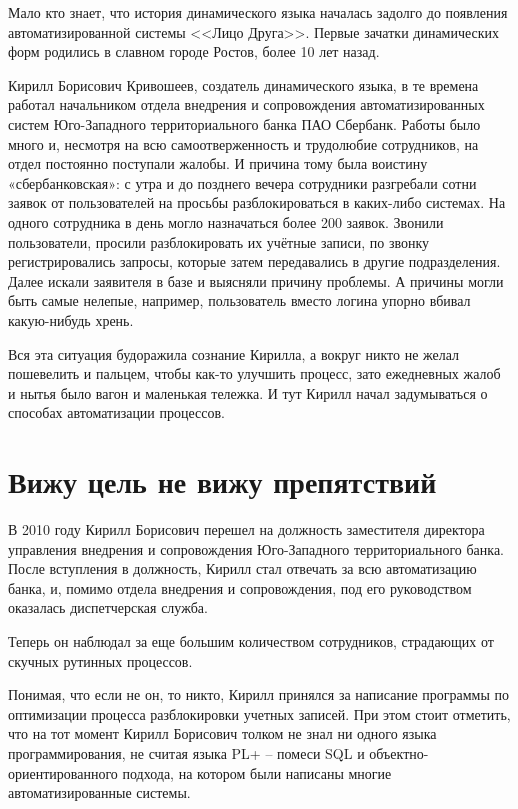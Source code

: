 \documentclass[../index.tex]{subfiles}
\begin{document}
Мало кто знает, что история динамического языка началась задолго до появления автоматизированной системы <<Лицо Друга>>. Первые зачатки динамических форм родились в славном городе Ростов, более 10 лет назад.


Кирилл Борисович Кривошеев, создатель динамического языка,  в те времена работал начальником отдела внедрения и сопровождения автоматизированных систем Юго-Западного территориального банка ПАО Сбербанк. Работы было много и, несмотря на всю самоотверженность и трудолюбие сотрудников, на отдел постоянно поступали жалобы. И причина тому была воистину «сбербанковская»: с утра и до позднего вечера сотрудники разгребали сотни заявок от пользователей на просьбы разблокироваться в каких-либо системах. На одного сотрудника в день могло назначаться более 200 заявок. Звонили пользователи, просили разблокировать их учётные записи, по звонку регистрировались запросы, которые затем передавались в другие подразделения. Далее искали заявителя в базе и выясняли причину проблемы. А причины могли быть самые нелепые, например, пользователь вместо логина упорно вбивал какую-нибудь хрень.


Вся эта ситуация будоражила сознание Кирилла, а вокруг никто не желал пошевелить и пальцем, чтобы как-то улучшить процесс, зато ежедневных жалоб и нытья было вагон и маленькая тележка.
И тут Кирилл начал задумываться о способах автоматизации процессов.

\section{Вижу цель не вижу препятствий}

В 2010 году Кирилл Борисович перешел на должность заместителя директора управления внедрения и сопровождения Юго-Западного территориального банка. После вступления в должность, Кирилл стал отвечать за всю автоматизацию банка, и, помимо отдела внедрения и сопровождения, под его руководством оказалась диспетчерская служба.

Теперь он наблюдал за еще большим количеством сотрудников, страдающих от скучных рутинных процессов.

Понимая, что если не он, то никто, Кирилл принялся за написание программы по оптимизации процесса разблокировки учетных записей. При этом стоит отметить, что на тот момент Кирилл Борисович толком не знал ни одного языка программирования, не считая языка PL+ -- помеси SQL и объектно-ориентированного подхода, на котором были написаны многие автоматизированные системы.
\end{document}
